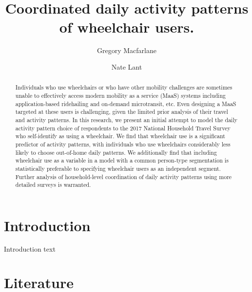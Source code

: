 \documentclass[3p, authoryear, review]{elsarticle} %
\begin{document}
\begin{frontmatter}

  \title{Coordinated daily activity patterns of wheelchair users.}
    \author[Brigham Young University]{Gregory Macfarlane}
    \author[Brigham Young University]{Nate Lant}
      \address[Brigham Young University]{Civil and Environmental Engineering Department, 430 Engineering Building, Provo, Utah 84602}
  
  \begin{abstract}
  Individuals who use wheelchairs or who have other mobility challenges are sometimes unable to effectively access modern mobility as a service (MaaS) systems including application-based ridehailing and on-demand microtransit, etc. Even designing a MaaS targeted at these users is challenging, given the limited prior analysis of their travel and activity patterns. In this research, we present an initial attempt to model the daily activity pattern choice of respondents to the 2017 National Household Travel Survey who self-identify as using a wheelchair. We find that wheelchair use is a significant predictor of activity patterns, with individuals who use wheelchairs considerably less likely to choose out-of-home daily patterns. We additionally find that including wheelchair use as a variable in a model with a common person-type segmentation is statistically preferable to specifying wheelchair users as an independent segment. Further analysis of household-level coordination of daily activity patterns using more detailed surveys is warranted.
  \end{abstract}
  
 \end{frontmatter}

\hypertarget{intro}{%
\section{Introduction}\label{intro}}

Introduction text

\hypertarget{literature}{%
\section{Literature}\label{literature}}
\end{document}
